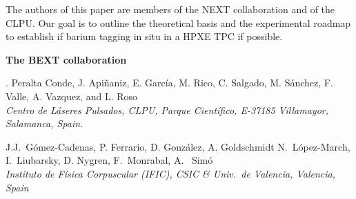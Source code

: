 \begin{titlepage}
\begin{center}
\begin{minipage}{15cm}
The authors of this paper are members of the NEXT collaboration and of the CLPU. Our goal is to outline the theoretical basis and the experimental roadmap to establish if barium tagging in situ in a HPXE TPC if possible.  

\end{minipage}
\end{center}

\begin{center}
\pagebreak 

{\LARGE \bf The BEXT collaboration}

\vspace{0.4cm}

{\small \sc . Peralta Conde, J. Api\~naniz, E. Garc\'ia,  M. Rico, C. Salgado, M. S\'anchez, F. Valle, A. Vazquez, and L. Roso}\\
{\it Centro de L\'aseres Pulsados, CLPU, Parque Cient\'ifico, E-37185 Villamayor, Salamanca, Spain.}

\vspace{0.3cm}

{\small \sc  J.J.~G\'omez-Cadenas, P. Ferrario, D. Gonz\'alez, A. Goldschmidt N.~L\'opez-March,  \\I.~Liubarsky, D. Nygren, F.~Monrabal, A. ~Simó}\\
{\it Instituto de F\'isica Corpuscular (IFIC), CSIC \& Univ.\ de Valencia, Valencia, Spain}

\end{center}




\end{titlepage}
